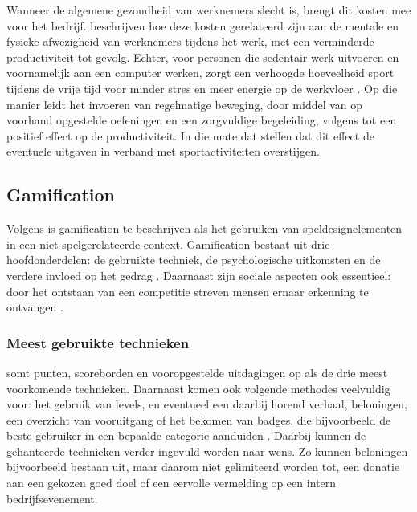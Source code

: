 Wanneer de algemene gezondheid van werknemers slecht is, brengt dit kosten mee voor het bedrijf. \textcite{Sjoegaard2016} beschrijven hoe deze kosten gerelateerd zijn aan de mentale en fysieke afwezigheid van werknemers tijdens het werk, met een verminderde productiviteit tot gevolg. Echter, voor personen die sedentair werk uitvoeren en voornamelijk aan een computer werken, zorgt een verhoogde hoeveelheid sport tijdens de vrije tijd voor minder stres en meer energie op de werkvloer \autocite{Hansen2009}. Op die manier leidt het invoeren van regelmatige beweging, door middel van op voorhand opgestelde oefeningen en een zorgvuldige begeleiding, volgens \textcite{Cancelliere2011} tot een positief effect op de productiviteit. In die mate dat \textcite{Sjoegaard2016} stellen dat dit effect de eventuele uitgaven in verband met sportactiviteiten overstijgen.

\subsection{Gamification}

Volgens \textcite{Deterding2011} is gamification te beschrijven als het gebruiken van speldesignelementen in een niet-spelgerelateerde context. Gamification bestaat uit drie hoofdonderdelen: de gebruikte techniek, de psychologische uitkomsten en de verdere invloed op het gedrag \autocite{Hamari2014}. Daarnaast zijn sociale aspecten ook essentieel: door het ontstaan van een competitie streven mensen ernaar erkenning te ontvangen \autocite{Hamari2013}.

\subsubsection{Meest gebruikte technieken}
\textcite{Hamari2014} somt punten, scoreborden en vooropgestelde uitdagingen op als de drie \linebreak meest voorkomende technieken. Daarnaast komen ook volgende methodes veelvuldig voor: het gebruik van levels, en eventueel een daarbij horend verhaal, beloningen, een overzicht van vooruitgang of het bekomen van badges, die bijvoorbeeld de beste gebruiker in een bepaalde categorie aanduiden \autocite{Dong2012,Flatla2011,Li2012}.
Daarbij kunnen de gehanteerde technieken verder ingevuld worden naar wens. Zo kunnen beloningen bijvoorbeeld bestaan uit, maar daarom niet gelimiteerd worden tot, een donatie aan een gekozen goed doel of een eervolle vermelding op een intern bedrijfsevenement.

